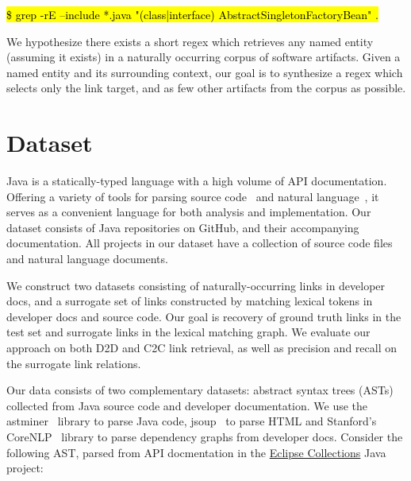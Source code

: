 \documentclass{article}
\newcommand*{\tinline}[1]{{\sethlcolor{slightgray}\ttfamily\footnotesize\relax\hl{#1}}}
\begin{document}
\centerline{\tinline{\$ grep -rE --include *.java "(class|interface) AbstractSingletonFactoryBean" .}}

We hypothesize there exists a short regex which retrieves any named entity (assuming it exists) in a naturally occurring corpus of software artifacts. Given a named entity and its surrounding context, our goal is to synthesize a regex which selects only the link target, and as few other artifacts from the corpus as possible.

\section{Dataset}

Java is a statically-typed language with a high volume of API documentation. Offering a variety of tools for parsing source code~\citep{parr2013definitive, hosseini2013javaparser, kovalenko2019pathminer} and natural language~\citep{manning2014stanford, grella2018non}, it serves as a convenient language for both analysis and implementation. Our dataset consists of Java repositories on GitHub, and their accompanying documentation. All projects in our dataset have a collection of source code files and natural language documents.

We construct two datasets consisting of naturally-occurring links in developer docs, and a surrogate set of links constructed by matching lexical tokens in developer docs and source code. Our goal is recovery of ground truth links in the test set and surrogate links in the lexical matching graph. We evaluate our approach on both D2D and C2C link retrieval, as well as precision and recall on the surrogate link relations.

Our data consists of two complementary datasets: abstract syntax trees (ASTs) collected from Java source code and developer documentation. We use the astminer~\citep{kovalenko2019pathminer} library to parse Java code, jsoup~\citep{hedley2009jsoup} to parse HTML and Stanford's CoreNLP~\citep{manning2014stanford} library to parse dependency graphs from developer docs. Consider the following AST, parsed from API docmentation in the \href{https://www.eclipse.org/collections/}{Eclipse Collections} Java project:

\vspace{20pt}

\begin{figure}[H]
    \centering
    
    \label{fig:ast}
\end{figure}
\end{document}
